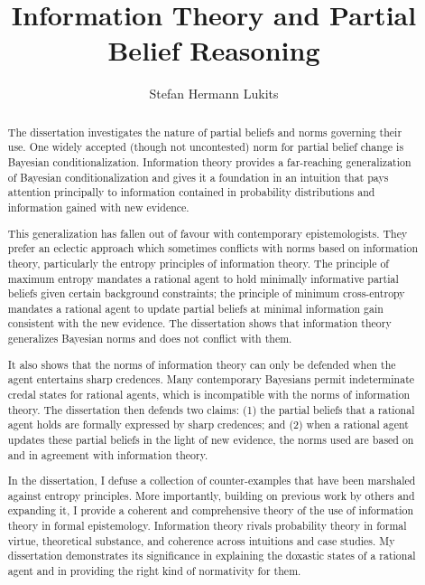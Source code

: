 \documentclass[phd,12pt,oneside]{ubcthesis}
\title{Information Theory and Partial Belief Reasoning}
\author{Stefan Hermann Lukits}
\begin{document}

\frontmatter
\maketitle
\begin{abstract}
  The dissertation investigates the nature of partial beliefs and
  norms governing their use. One widely accepted (though not
  uncontested) norm for partial belief change is Bayesian
  conditionalization. Information theory provides a far-reaching
  generalization of Bayesian conditionalization and gives it a
  foundation in an intuition that pays attention principally to
  information contained in probability distributions and information
  gained with new evidence. 

  This generalization has fallen out of favour with contemporary
  epistemologists. They prefer an eclectic approach which sometimes
  conflicts with norms based on information theory, particularly the
  entropy principles of information theory. The principle of maximum
  entropy mandates a rational agent to hold minimally informative
  partial beliefs given certain background constraints; the principle
  of minimum cross-entropy mandates a rational agent to update partial
  beliefs at minimal information gain consistent with the new
  evidence. The dissertation shows that information theory generalizes
  Bayesian norms and does not conflict with them.

  It also shows that the norms of information theory can only be
  defended when the agent entertains sharp credences. Many
  contemporary Bayesians permit indeterminate credal states for
  rational agents, which is incompatible with the norms of information
  theory. The dissertation then defends two claims: (1) the partial
  beliefs that a rational agent holds are formally expressed by sharp
  credences; and (2) when a rational agent updates these partial
  beliefs in the light of new evidence, the norms used are based on
  and in agreement with information theory.

  In the dissertation, I defuse a collection of counter-examples that
  have been marshaled against entropy principles. More importantly,
  building on previous work by others and expanding it, I provide a
  coherent and comprehensive theory of the use of information theory
  in formal epistemology. Information theory rivals probability theory
  in formal virtue, theoretical substance, and coherence across
  intuitions and case studies. My dissertation demonstrates its
  significance in explaining the doxastic states of a rational agent
  and in providing the right kind of normativity for them.
\end{abstract}
\end{document}
